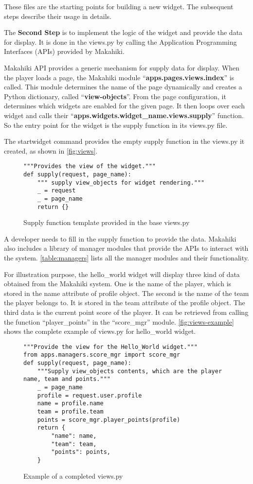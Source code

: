 These files are the starting points for building a new widget. The subsequent steps describe their usage in details.

The {\bf Second Step} is to implement the logic of the widget and provide the data for display. It is done in the views.py by calling the Application Programming Interfaces (APIs) provided by Makahiki. 

Makahiki API provides a generic mechanism for supply data for display.  When the player loads a page, the Makahiki module ``{\bf apps.pages.views.index}'' is called. This module determines the name of the page dynamically and creates a Python dictionary, called ``{\bf view-objects}''.  From the page configuration, it determines which widgets are enabled for the given page. It then loops over each widget and calls their ``{\bf apps.widgets.widget\_name.views.supply}'' function. So the entry point for the widget is the supply function in its views.py file. 

The startwidget command provides the empty supply function in the views.py it created, as shown in \autoref{fig:views}. 
\begin{figure}[!ht]
\begin{lstlisting}
"""Provides the view of the widget."""
def supply(request, page_name):
    """ supply view_objects for widget rendering."""
    _ = request
    _ = page_name
    return {}
\end{lstlisting}
\caption{Supply function template provided in the base views.py}
\label{fig:views}
\end{figure}

A developer needs to fill in the supply function to provide the data. Makahiki also includes a library of manager modules that provide the APIs to interact with the system. \autoref{table:managers} lists all the manager modules and their functionality. 

For illustration purpose, the hello\_world widget will display three kind of data obtained from the Makahiki system. One is the name of the player, which is stored in the name attribute of profile object. The second is the name of the team the player belongs to. It is stored in the team attribute of the profile object. The third data is the current point score of the player. It can be retrieved from calling the function ``player\_points'' in the ``score\_mgr'' module. \autoref{fig:views-example} shows the complete example of views.py for hello\_world widget.

\begin{figure}[!ht]
\begin{lstlisting}
"""Provide the view for the Hello_World widget."""
from apps.managers.score_mgr import score_mgr
def supply(request, page_name):
    """Supply view_objects contents, which are the player name, team and points."""
    _ = page_name
    profile = request.user.profile
    name = profile.name
    team = profile.team
    points = score_mgr.player_points(profile)
    return {
        "name": name,
        "team": team,
        "points": points,
    }
\end{lstlisting}
\caption{Example of a completed views.py}
\label{fig:views-example}
\end{figure}


